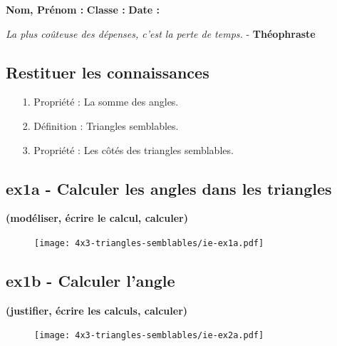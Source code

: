



\textbf{Nom, Prénom :} \hspace{8cm} \textbf{Classe :} \hspace{3cm} \textbf{Date :}\\

\begin{center}
  \textit{La plus coûteuse des dépenses, c’est la perte de temps.}  - \textbf{Théophraste}
\end{center}

\subsection*{Restituer les connaissances}

\begin{enumerate}
  \item[1.] Propriété : La somme des angles. \newline \Pointilles[1]
  \item[2.] Définition : Triangles semblables. \newline \Pointilles[1]
  \item[3.] Propriété : Les côtés des triangles semblables. \newline \Pointilles[1]
\end{enumerate}

\subsection*{ex1a - Calculer les angles dans les triangles}
\textbf{(modéliser, écrire le calcul, calculer)}

\begin{figure}[H]
  \centering
  \texttt{[image: 4x3-triangles-semblables/ie-ex1a.pdf]}
\end{figure}
\Pointilles[2]

\begin{minipage}[t]{0.55\textwidth}
  \subsection*{ex1b - Calculer l'angle}
  \textbf{(justifier, écrire les calculs, calculer)}
  \Pointilles[6]
\end{minipage}
\begin{minipage}[t]{0.4\textwidth}
  \begin{figure}[H]
    \centering
    \texttt{[image: 4x3-triangles-semblables/ie-ex2a.pdf]}
  \end{figure}
\end{minipage}


